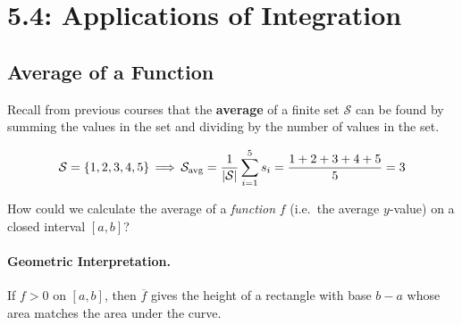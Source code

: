 \documentclass[12pt]{article}
\begin{document}
\section*{5.4: Applications of Integration}


\vspace{5mm}

\subsection*{Average of a Function}

Recall from previous courses that the \textbf{average} of a finite set $\mathcal{S}$ can be found by summing the values in the set and dividing by the number of values in the set.

$$\mathcal{S}=\left\{ 1,2,3,4,5 \right\} \,\Longrightarrow\,\mathcal{S}_\text{avg}=\frac{1}{\vert\mathcal{S}\vert}\sum_{i=1}^5 s_i=\frac{1+2+3+4+5}{5}=3$$

\vspace{3mm}

How could we calculate the average of a \textit{function} $f$ (i.e.\ the average $y$-value) on a closed interval $[a,b]$?

\newpage


\vspace{3mm}

\paragraph{Geometric Interpretation.} If $f>0$ on $[a,b]$, then $\overline{f}$ gives the height of a rectangle with base $b-a$ whose area matches the area under the curve.
\end{document}
